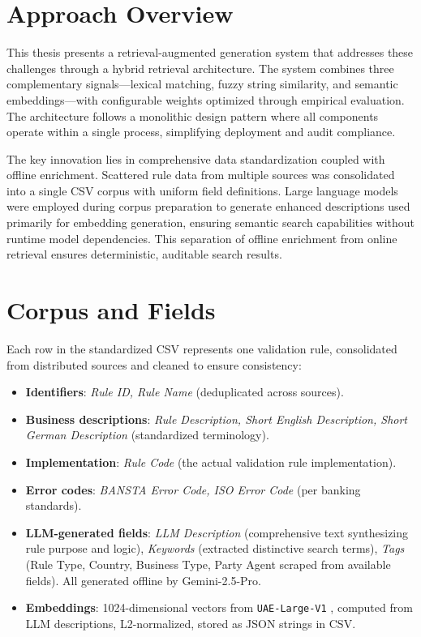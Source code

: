 \newpage
\section{Approach Overview}
This thesis presents a retrieval-augmented generation system that addresses these challenges through a hybrid retrieval architecture. The system combines three complementary signals—lexical matching, fuzzy string similarity, and semantic embeddings—with configurable weights optimized through empirical evaluation. The architecture follows a monolithic design pattern where all components operate within a single process, simplifying deployment and audit compliance.

The key innovation lies in comprehensive data standardization coupled with offline enrichment. Scattered rule data from multiple sources was consolidated into a single CSV corpus with uniform field definitions. Large language models were employed during corpus preparation to generate enhanced descriptions used primarily for embedding generation, ensuring semantic search capabilities without runtime model dependencies. This separation of offline enrichment from online retrieval ensures deterministic, auditable search results.

\section{Corpus and Fields}
Each row in the standardized CSV represents one validation rule, consolidated from distributed sources and cleaned to ensure consistency:
\begin{itemize}[leftmargin=*,itemsep=2pt,topsep=2pt]
 \item \textbf{Identifiers}: \textit{Rule ID, Rule Name} (deduplicated across sources).
 \item \textbf{Business descriptions}: \textit{Rule Description, Short English Description, Short German Description} (standardized terminology).
 \item \textbf{Implementation}: \textit{Rule Code} (the actual validation rule implementation).
 \item \textbf{Error codes}: \textit{BANSTA Error Code, ISO Error Code} (per banking standards).
 \item \textbf{LLM-generated fields}: \textit{LLM Description} (comprehensive text synthesizing rule purpose and logic), \textit{Keywords} (extracted distinctive search terms), \textit{Tags} (Rule Type, Country, Business Type, Party Agent scraped from available fields). All generated offline by Gemini-2.5-Pro.
 \item \textbf{Embeddings}: 1024-dimensional vectors from \texttt{UAE-Large-V1} \cite{uae2023large}, computed from LLM descriptions, L2-normalized, stored as JSON strings in CSV.
\end{itemize}

